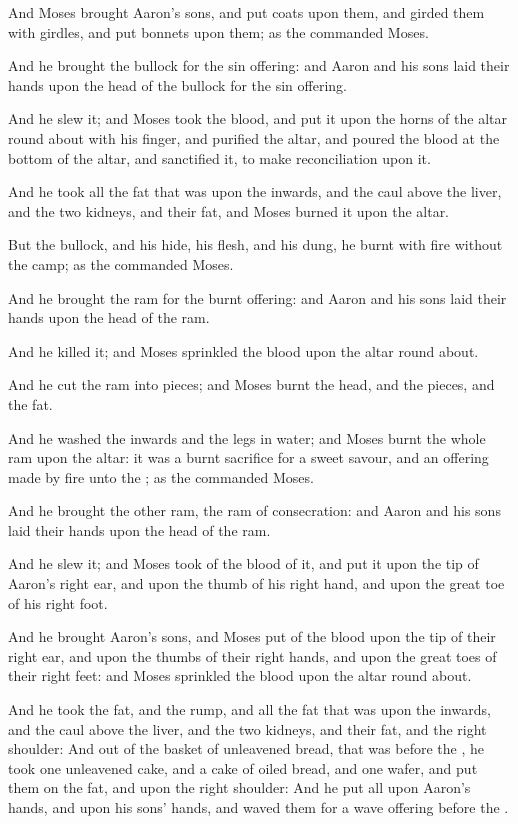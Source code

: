 \Verse And Moses brought Aaron's sons, and put coats upon them, and girded them with girdles, and put bonnets upon them; as the \LORD commanded Moses.

\Verse And he brought the bullock for the sin offering: and Aaron and his sons laid their hands upon the head of the bullock for the sin offering.

\Verse And he slew it; and Moses took the blood, and put it upon the horns of the altar round about with his finger, and purified the altar, and poured the blood at the bottom of the altar, and sanctified it, to make reconciliation upon it.

\Verse And he took all the fat that was upon the inwards, and the caul above the liver, and the two kidneys, and their fat, and Moses burned it upon the altar.

\Verse But the bullock, and his hide, his flesh, and his dung, he burnt with fire without the camp; as the \LORD commanded Moses.

\Verse And he brought the ram for the burnt offering: and Aaron and his sons laid their hands upon the head of the ram.

\Verse And he killed it; and Moses sprinkled the blood upon the altar round about.

\Verse And he cut the ram into pieces; and Moses burnt the head, and the pieces, and the fat.

\Verse And he washed the inwards and the legs in water; and Moses burnt the whole ram upon the altar: it was a burnt sacrifice for a sweet savour, and an offering made by fire unto the \LORD; as the \LORD commanded Moses.

\Verse And he brought the other ram, the ram of consecration: and Aaron and his sons laid their hands upon the head of the ram.

\Verse And he slew it; and Moses took of the blood of it, and put it upon the tip of Aaron's right ear, and upon the thumb of his right hand, and upon the great toe of his right foot.

\Verse And he brought Aaron's sons, and Moses put of the blood upon the tip of their right ear, and upon the thumbs of their right hands, and upon the great toes of their right feet: and Moses sprinkled the blood upon the altar round about.

\Verse And he took the fat, and the rump, and all the fat that was upon the inwards, and the caul above the liver, and the two kidneys, and their fat, and the right shoulder: \Verse And out of the basket of unleavened bread, that was before the \LORD, he took one unleavened cake, and a cake of oiled bread, and one wafer, and put them on the fat, and upon the right shoulder: \Verse And he put all upon Aaron's hands, and upon his sons' hands, and waved them for a wave offering before the \LORD.

